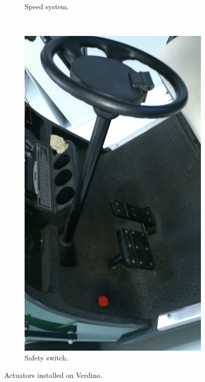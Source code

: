 \begin{figure}[h!]
\begin{subfigure}[b]{0.24\textwidth}
                \caption{Speed system.}\label{fig:cp00_speed}
        \end{subfigure}%
        ~
        \begin{subfigure}[b]{0.24\textwidth}
                \centering
                \includegraphics[width=\textwidth]{safety}
                \caption{Safety switch.}\label{fig:cp00_safety_switch}
        \end{subfigure}%
        \caption{Actuators installed on Verdino.}\label{fig:cp00_actuators}
\end{figure}

